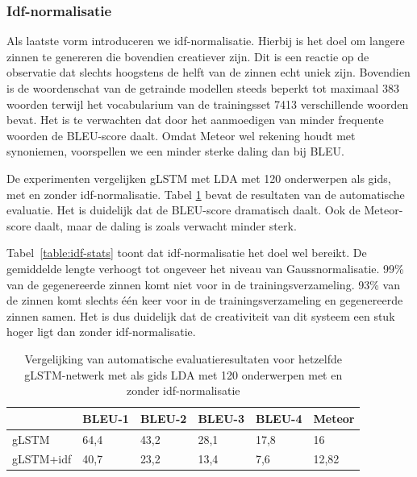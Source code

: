 \subsubsection{Idf-normalisatie}
Als laatste vorm introduceren we idf-normalisatie. Hierbij is het doel om langere zinnen te genereren die bovendien creatiever zijn.
Dit is een reactie op de observatie dat slechts hoogstens de helft van de zinnen echt uniek zijn. Bovendien is de woordenschat van de getrainde modellen steeds beperkt tot
maximaal 383 woorden terwijl het vocabularium van de trainingsset 7413 verschillende woorden bevat.
Het is te verwachten dat door het aanmoedigen van minder frequente woorden de BLEU-score daalt. Omdat Meteor wel rekening houdt met synoniemen, voorspellen we een minder sterke daling dan bij BLEU.

De experimenten vergelijken gLSTM met LDA met 120 onderwerpen als gids, met en zonder idf-normalisatie.
Tabel \ref{table:idf-results} bevat de resultaten van de automatische evaluatie. Het is duidelijk dat de BLEU-score dramatisch daalt. Ook de Meteor-score daalt, maar de daling is zoals verwacht minder sterk.

Tabel~\ref{table:idf-stats} toont dat idf-normalisatie het doel wel bereikt. De gemiddelde lengte verhoogt tot ongeveer het niveau van Gaussnormalisatie. 99\% van de gegenereerde zinnen komt niet voor in de trainingsverzameling. 93\% van de zinnen komt slechts \'e\'en keer voor in de trainingsverzameling en gegenereerde zinnen samen. Het is dus duidelijk dat de creativiteit van dit systeem een stuk hoger ligt dan zonder idf-normalisatie.
\begin{table}
	\centering
	\begin{tabular}{llllll}
		~                  & BLEU-1 & BLEU-2 & BLEU-3 & BLEU-4 & Meteor \\ \hline
		gLSTM        & 64,4   & 43,2 			& 28,1   & 17,8   & 16 \\
		gLSTM+idf   & 40,7   & 23,2   & 13,4   & 7,6 & 12,82 \\ \hline
		
	\end{tabular}
	
	\caption{Vergelijking van automatische evaluatieresultaten voor hetzelfde gLSTM-netwerk met als gids LDA met 120 onderwerpen met en zonder idf-normalisatie}
	\label{table:idf-results}
\end{table}

